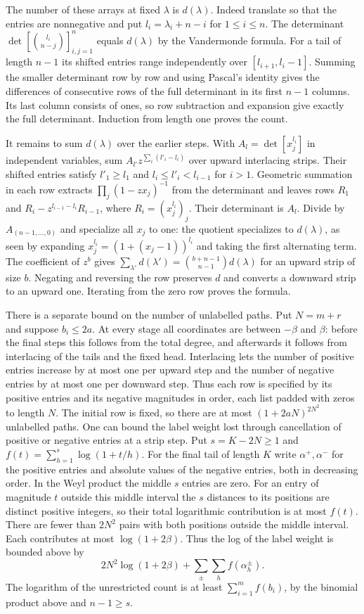 \documentclass[11pt]{amsart}
\theoremstyle{definition}
\theoremstyle{remark}
\begin{document}
The number of these arrays at fixed $\lambda$ is $d(\lambda)$.
Indeed translate so that the entries are nonnegative and put
$l_i=\lambda_i+n-i$ for $1\le i\le n$. The determinant
$\det[\binom{l_i}{n-j}]_{i,j=1}^n$ equals $d(\lambda)$ by
the Vandermonde formula. For a tail of length $n-1$ its shifted
entries range independently over $[l_{i+1},l_i-1]$.
Summing the smaller determinant row by row and using Pascal's
identity gives the differences of consecutive rows of the full
determinant in its first $n-1$ columns. Its last column consists
of ones, so row subtraction and expansion give exactly the full
determinant. Induction from length one proves the count.

It remains to sum $d(\lambda)$ over the earlier steps. With
$A_l=\det[x_j^{l_i}]$ in independent variables, sum
$A_{l'}z^{\sum_i(l'_i-l_i)}$ over upward interlacing strips.
Their shifted entries satisfy $l'_1\ge l_1$ and
$l_i\le l'_i<l_{i-1}$ for $i>1$. Geometric summation in each
row extracts $\prod_j(1-zx_j)^{-1}$ from the determinant and
leaves rows $R_1$ and $R_i-z^{l_{i-1}-l_i}R_{i-1}$,
where $R_i=(x_j^{l_i})_j$. Their determinant is $A_l$.
Divide by $A_{(n-1,\ldots,0)}$ and specialize all $x_j$ to one:
the quotient specializes to $d(\lambda)$, as seen by expanding
$x_j^{l_i}=(1+(x_j-1))^{l_i}$ and taking the first alternating
term. The coefficient of $z^b$ gives
$\sum_{\lambda'}d(\lambda')=\binom{b+n-1}{n-1}d(\lambda)$
for an upward strip of size $b$. Negating and reversing the row
preserves $d$ and converts a downward strip to an upward one.
Iterating from the zero row proves the formula.

There is a separate bound on the number of unlabelled paths.
Put $N=m+r$ and suppose $b_i\le2a$. At every stage all
coordinates are between $-\beta$ and $\beta$: before the final
steps this follows from the total degree, and afterwards it
follows from interlacing of the tails and the fixed head.
Interlacing lets the number of positive entries increase by at
most one per upward step and the number of negative entries by
at most one per downward step. Thus each row is specified by
its positive entries and its negative magnitudes in order, each
list padded with zeros to length $N$. The initial row is fixed,
so there are at most $(1+2aN)^{2N^2}$ unlabelled paths.
One can bound the label weight lost through cancellation of positive
or negative entries at a strip step. Put $s=K-2N\ge1$ and
$f(t)=\sum_{h=1}^s\log(1+t/h)$. For the final tail of length $K$
write $\alpha^+,\alpha^-$ for the positive entries and absolute
values of the negative entries, both in decreasing order.
In the Weyl product the middle $s$ entries are zero. For an
entry of magnitude $t$ outside this middle interval the $s$
distances to its positions are distinct positive integers, so
their total logarithmic contribution is at most $f(t)$.
There are fewer than $2N^2$ pairs with both positions outside
the middle interval. Each contributes at most $\log(1+2\beta)$.
Thus the log of the label weight is bounded above by
\[
 2N^2\log(1+2\beta)+\sum_{\pm}\sum_h f(\alpha_h^\pm).
\]
The logarithm of the unrestricted count is at least
$\sum_{i=1}^m f(b_i)$, by the binomial product above and
$n-1\ge s$.
\end{document}
